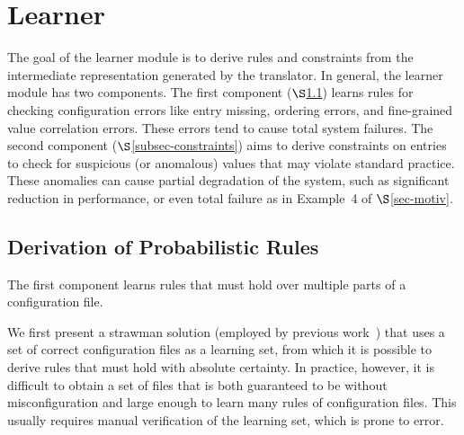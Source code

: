 \section{Learner}
\label{sec-learn}

The goal of the learner module is to derive rules and constraints from
the intermediate representation generated by the translator.
In general, the learner module has two components.
The first component ($\S$\ref{subsec-rules}) 
learns rules for checking configuration errors like
entry missing, ordering errors, and fine-grained value correlation errors. 
These errors tend to cause total system failures.
The second component ($\S$\ref{subsec-constraints}) 
aims to derive 
constraints on entries to check for suspicious (or anomalous) values 
that may violate standard practice. These anomalies can cause partial 
degradation of the system, 
such as significant reduction in performance, or even 
total failure as in Example~4 of $\S$\ref{sec-motiv}.

\subsection{Derivation of Probabilistic Rules}
\label{subsec-rules}

The first component learns rules 
that must hold over multiple parts of a configuration file.

We first present a strawman solution (employed by
previous work~\cite{santolucitoCAV, zhang14encore}) that uses 
a set of correct configuration files as a learning set, 
from which it is possible to derive rules 
that must hold with absolute certainty. 
In practice, however, it is difficult to obtain a set of files 
that is both guaranteed to be without misconfiguration 
and large enough to learn many rules of configuration files.
This usually requires manual verification of the learning set, 
which is prone to error.

